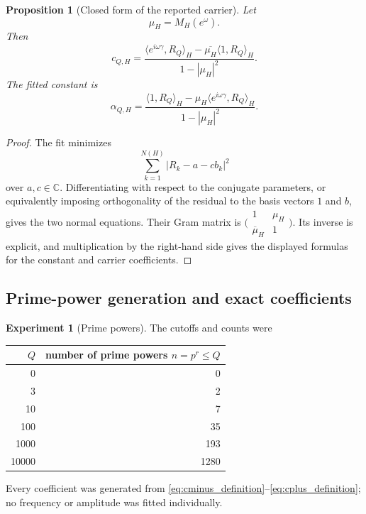 \documentclass[11pt]{amsart}
\numberwithin{equation}{section}
\theoremstyle{plain}
\newtheorem{proposition}[theorem]{Proposition}
\theoremstyle{definition}
\newtheorem{experiment}[theorem]{Experiment}
\theoremstyle{remark}
\newcommand{\1}{\mathbf{1}}
\begin{document}
\begin{proposition}[Closed form of the reported carrier]
\label{prop:numerical_joint_carrier}
Let
\begin{equation}
\mu_H=M_H(e^\omega).
\label{eq:numerical_muH}
\end{equation}
Then
\begin{equation}
\boxed{
c_{Q,H}
=
\frac{
\langle e^{i\omega\gamma},R_Q\rangle_H
-
\overline{\mu_H}\langle1,R_Q\rangle_H
}{1-|\mu_H|^2}.
}
\label{eq:numerical_joint_carrier}
\end{equation}
The fitted constant is
\begin{equation}
\alpha_{Q,H}
=
\frac{
\langle1,R_Q\rangle_H
-
\mu_H\langle e^{i\omega\gamma},R_Q\rangle_H
}{1-|\mu_H|^2}.
\label{eq:numerical_joint_constant}
\end{equation}
\end{proposition}

\begin{proof}
The fit minimizes
\begin{equation}
\sum_{k=1}^{N(H)}|R_k-a-cb_k|^2
\label{eq:numerical_joint_objective_proof}
\end{equation}
over \(a,c\in\mathbb C\).  Differentiating with respect to the conjugate
parameters, or equivalently imposing orthogonality of the residual to the
basis vectors \(1\) and \(b\), gives the two normal equations.  Their Gram
matrix is
\(\bigl(\begin{smallmatrix}1&\mu_H\\\overline\mu_H&1\end{smallmatrix}\bigr)\).
Its inverse is explicit, and multiplication by the right-hand side gives
the displayed formulas for the constant and carrier coefficients.
\end{proof}

\subsection{Prime-power generation and exact coefficients}
\label{subsec:numerical_prime_powers}

\begin{experiment}[Prime powers]
\label{exp:numerical_prime_power_counts}
The cutoffs and counts were
\begin{center}
\begin{tabular}{rr}
\toprule
$Q$ & number of prime powers $n=p^r\leq Q$\\
\midrule
0 & 0\\
3 & 2\\
10 & 7\\
100 & 35\\
1000 & 193\\
10000 & 1280\\
\bottomrule
\end{tabular}
\end{center}
Every coefficient was generated from
\eqref{eq:cminus_definition}--\eqref{eq:cplus_definition}; no frequency or
amplitude was fitted individually.
\end{experiment}
\end{document}
